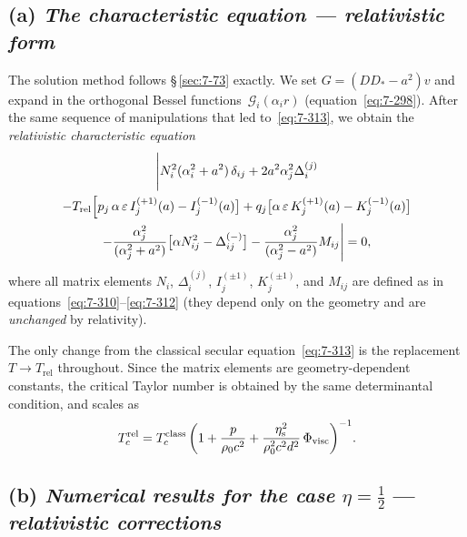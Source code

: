 \subsection*{(a) \textit{The characteristic equation --- relativistic form}}
\label{sec:rel-7-73a}

The solution method follows \S\,\ref{sec:7-73} exactly.  We set
$G = (DD_{*}-a^{2})v$ and expand in the orthogonal Bessel
functions~$\mathscr{G}_{i}(\alpha_{i}r)$
(equation~\eqref{eq:7-298}).  After the same sequence of manipulations
that led to~\eqref{eq:7-313}, we obtain the \emph{relativistic
characteristic equation}
\begin{multline}
\label{eq:rel-7-298}
\Biggl|N_{i}^{2}(\alpha_{i}^{2}+a^{2})\,\delta_{ij}
  + 2a^{2}\alpha_{j}^{2}\Delta_{i}^{(j)} \\
- T_{\mathrm{rel}}\Bigl[
  p_{j}\,\alpha\,\varepsilon\,I_{j}^{(+1)}(a)
  - I_{j}^{(-1)}(a)\bigr]
  + q_{j}\bigl[\alpha\,\varepsilon\,K_{j}^{(+1)}(a)
  - K_{j}^{(-1)}(a)\bigr] \\
  - \frac{\alpha_{j}^{2}}{(\alpha_{j}^{2}+a^{2})}
    \bigl[\alpha N_{ij}^{2} - \Delta_{ij}^{(-)}\bigr]
  - \frac{\alpha_{j}^{2}}{(\alpha_{j}^{2}-a^{2})}M_{ij}
  \Biggr| = 0,
\end{multline}
where all matrix elements $N_{i}$, $\Delta_{i}^{(j)}$,
$I_{j}^{(\pm 1)}$, $K_{j}^{(\pm 1)}$, and $M_{ij}$ are defined as in
equations~\eqref{eq:7-310}--\eqref{eq:7-312} (they depend only on the
geometry and are \emph{unchanged} by relativity).

The only change from the classical secular equation~\eqref{eq:7-313}
is the replacement $T \to T_{\mathrm{rel}}$ throughout.  Since the
matrix elements are geometry-dependent constants, the critical Taylor
number is obtained by the same determinantal condition, and scales as
\begin{equation}
\label{eq:rel-7-299}
T_{c}^{\mathrm{rel}}
= T_{c}^{\mathrm{class}}
  \left(1 + \frac{p}{\rho_0 c^{2}}
           + \frac{\eta_{\mathrm{s}}^{2}}{\rho_0^{2}c^{2}d^{2}}\,
             \Phi_{\mathrm{visc}}\right)^{-1}\!.
\end{equation}

\subsection*{(b) \textit{Numerical results for the case}
  $\eta = \frac{1}{2}$ --- \textit{relativistic corrections}}
\label{sec:rel-7-73b}

